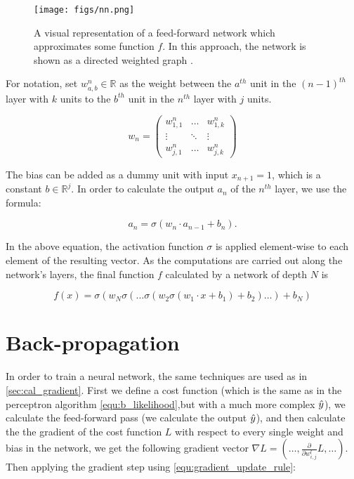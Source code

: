 \begin{figure}[!htpb]
  \centering
  \texttt{[image: figs/nn.png]}
  \caption[A visual representation of a feed-forward network]{A visual representation of a feed-forward network which approximates some function $f$. In this approach, the network is shown as a
    directed weighted graph \cite{Guil}.}\label{fig:ann}
\end{figure}

For notation, set $w^n_{a, b} \in \mathbb{R}$ as the weight between the $a^{th}$ unit in the $(n - 1)^{th}$ layer with $k$ units to the $b^{th}$ unit in the $n^{th}$ layer with $j$ units.

\begin{equation}
  w_n = \begin{pmatrix}
    w^n_{1, 1} & \ldots & w^n_{1, k} \\
    \vdots & \ddots & \vdots \\
    w^n_{j, 1} & \ldots & w^n_{j, k}
  \end{pmatrix}
\end{equation}

The bias can be added as a dummy unit with input $x_{n+1} = 1$, which is a constant $b \in \mathbb{R}^j$. In order to calculate the output $a_n$ of the $n^{th}$ layer, we use the formula:

$$
a_n = \sigma (w_n \cdot a_{n - 1} + b_n).
$$

In the above equation, the activation function $\sigma$ is applied element-wise to each element of the resulting vector. As the computations are carried out along the network's layers, the final function $f$ calculated by a network of depth $N$ is \cite{Guil}

$$
f(x) = \sigma(w_N\sigma(\ldots\sigma (w_2 \sigma(w_1 \cdot x + b_1) + b_2) \ldots) + b_N)
$$

\section{Back-propagation}\label{section:backprop}
In order to train a neural network, the same techniques are used as in \cref{sec:cal_gradient}. First we define a cost function (which is the same as in the perceptron algorithm \cref{equ:b_likelihood},but with a much more complex $\hat{y}$), we calculate the feed-forward pass (we calculate the output $\hat{y}$), and then calculate the the gradient of the cost function $L$ with respect to every single weight and bias in the network, we get the following gradient vector $\nabla L = (\ldots, \frac{\partial}{\partial w^l_{i, j}} L, \ldots)$. Then applying the gradient step using \cref{equ:gradient_update_rule}:


